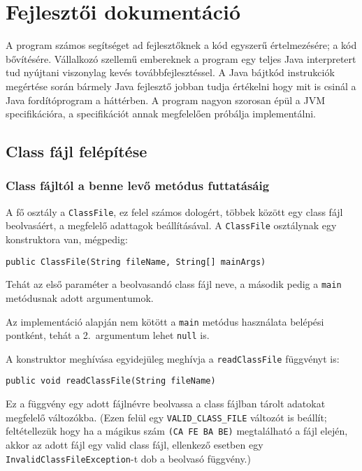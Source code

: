 \chapter{Fejlesztői dokumentáció}
\label{ch:impl}

A program számos segítséget ad fejlesztőknek a kód egyszerű értelmezésére; a kód bővítésére. Vállalkozó szellemű embereknek a program egy teljes Java interpretert tud nyújtani viszonylag kevés továbbfejlesztéssel. A Java bájtkód instrukciók megértése során bármely Java fejlesztő jobban tudja értékelni hogy mit is csinál a Java fordítóprogram a háttérben. A program nagyon szorosan épül a JVM specifikációra, a specifikációt annak megfelelően próbálja implementálni.

\section{Class fájl felépítése}

\subsection{Class fájltól a benne levő metódus futtatásáig}

A fő osztály a \lstinline{ClassFile}, ez felel számos dologért, többek között egy class fájl beolvasáért, a megfelelő adattagok beállításával. A \lstinline{ClassFile} osztálynak egy konstruktora van, mégpedig:
\begin{verbatim}
public ClassFile(String fileName, String[] mainArgs)
\end{verbatim}
Tehát az első paraméter a beolvasandó class fájl neve, a második pedig a \lstinline{main} metódusnak adott argumentumok.

Az implementáció alapján nem kötött a \lstinline{main} metódus használata belépési pontként, tehát a 2.\ argumentum lehet \lstinline{null} is.

A konstruktor meghívása egyidejüleg meghívja a \lstinline{readClassFile} függvényt is:
\begin{verbatim}
public void readClassFile(String fileName)
\end{verbatim}
Ez a függvény egy adott fájlnévre beolvassa a class fájlban tárolt adatokat megfelelő változókba.
(Ezen felül egy \lstinline{VALID_CLASS_FILE} változót is beállít; feltétellezük hogy ha a mágikus szám \lstinline{(CA FE BA BE)} megtalálható a fájl elején, akkor az adott fájl egy valid class fájl, ellenkező esetben egy \lstinline{InvalidClassFileException}-t dob a beolvasó függvény.)

